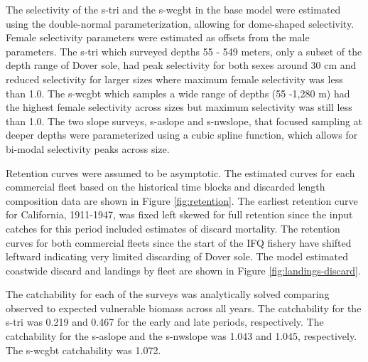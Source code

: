 \documentclass[11pt,
  english,
  a4paper,
]{article}
\begin{document}
\leavevmode\tagmcend\tagstructend\par


The selectivity of the \gls{s-tri} and the \gls{s-wcgbt} in the base model were estimated using the double-normal parameterization, allowing for dome-shaped selectivity. Female selectivity parameters were estimated as offsets from the male parameters. The \gls{s-tri} which surveyed depths 55 - 549 meters, only a subset of the depth range of Dover sole, had peak selectivity for both sexes around 30 cm and reduced selectivity for larger sizes where maximum female selectivity was less than 1.0. The \gls{s-wcgbt} which samples a wide range of depths (55 -1,280 m) had the highest female selectivity across sizes but maximum selectivity was still less than 1.0. The two slope surveys, \gls{s-aslope} and \gls{s-nwslope}, that focused sampling at deeper depths were parameterized using a cubic spline function, which allows for bi-modal selectivity peaks across size.

\leavevmode\tagmcend\tagstructend\par


Retention curves were assumed to be asymptotic. The estimated curves for each commercial fleet based on the historical time blocks and discarded length composition data are shown in Figure \ref{fig:retention}. The earliest retention curve for California, 1911-1947, was fixed left skewed for full retention since the input catches for this period included estimates of discard mortality. The retention curves for both commercial fleets since the start of the IFQ fishery have shifted leftward indicating very limited discarding of Dover sole. The model estimated coastwide discard and landings by fleet are shown in Figure \ref{fig:landings-discard}.

\leavevmode\tagmcend\tagstructend\par


The catchability for each of the surveys was analytically solved comparing observed to expected vulnerable biomass across all years. The catchability for the \gls{s-tri} was 0.219 and 0.467 for the early and late periods, respectively. The catchability for the \gls{s-aslope} and the \gls{s-nwslope} was 1.043 and 1.045, respectively. The \gls{s-wcgbt} catchability was 1.072.
\end{document}
